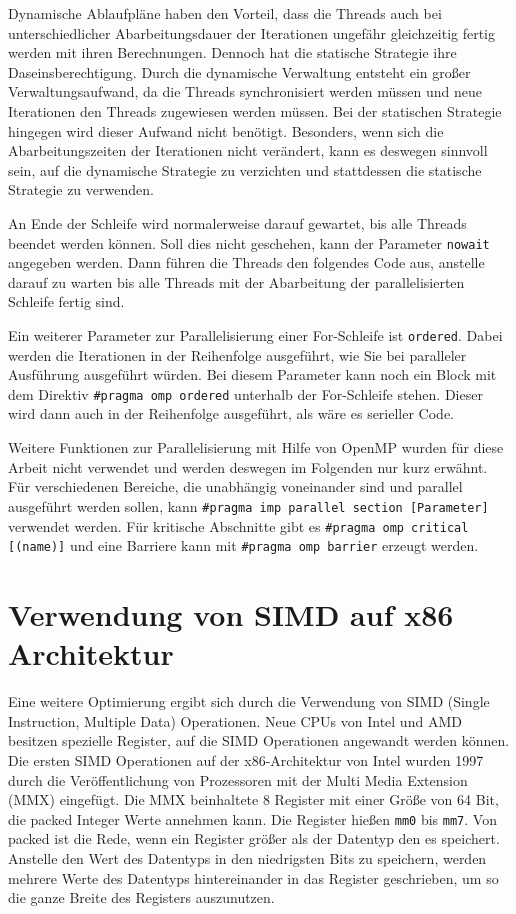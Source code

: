 \documentclass[../main.tex]{subfiles}
\begin{document}
Dynamische Ablaufpläne haben den Vorteil, dass die Threads auch bei unterschiedlicher Abarbeitungsdauer der Iterationen ungefähr gleichzeitig fertig werden mit ihren Berechnungen. Dennoch hat die statische Strategie ihre Daseinsberechtigung. Durch die dynamische Verwaltung entsteht ein großer Verwaltungsaufwand, da die Threads synchronisiert werden müssen und neue Iterationen den Threads zugewiesen werden müssen. Bei der statischen Strategie hingegen wird dieser Aufwand nicht benötigt. Besonders, wenn sich die Abarbeitungszeiten der Iterationen nicht verändert, kann es deswegen sinnvoll sein, auf die dynamische Strategie zu verzichten und stattdessen die statische Strategie zu verwenden.

An Ende der Schleife wird normalerweise darauf gewartet, bis alle Threads beendet werden können. Soll dies nicht geschehen, kann der Parameter \texttt{nowait} angegeben werden. Dann führen die Threads den folgendes Code aus, anstelle darauf zu warten bis alle Threads mit der Abarbeitung der parallelisierten Schleife fertig sind.

Ein weiterer Parameter zur Parallelisierung einer For-Schleife ist \texttt{ordered}. Dabei werden die Iterationen in der Reihenfolge ausgeführt, wie Sie bei paralleler Ausführung ausgeführt würden. Bei diesem Parameter kann noch ein Block mit dem Direktiv \texttt{\#pragma omp ordered} unterhalb der For-Schleife stehen. Dieser wird dann auch in der Reihenfolge ausgeführt, als wäre es serieller Code.

Weitere Funktionen zur Parallelisierung mit Hilfe von OpenMP wurden für diese Arbeit nicht verwendet und werden deswegen im Folgenden nur kurz erwähnt.
Für verschiedenen Bereiche, die unabhängig voneinander sind und parallel ausgeführt werden sollen, kann \texttt{\#pragma imp parallel section [Parameter]} verwendet werden.
Für kritische Abschnitte gibt es \texttt{\#pragma omp critical [(name)]} und eine Barriere kann mit \texttt{\#pragma omp barrier} erzeugt werden.

\section{Verwendung von SIMD auf x86 Architektur}

Eine weitere Optimierung ergibt sich durch die Verwendung von SIMD (Single Instruction, Multiple Data) Operationen.  Neue CPUs von Intel und AMD besitzen spezielle Register, auf die SIMD Operationen angewandt werden können. 
Die ersten SIMD Operationen auf der x86-Architektur von Intel wurden 1997 durch die Veröffentlichung von Prozessoren mit der Multi Media Extension (MMX) eingefügt. Die MMX beinhaltete 8 Register mit einer Größe von 64 Bit, die packed Integer Werte annehmen kann. Die Register hießen \texttt{mm0} bis \texttt{mm7}.
Von packed ist die Rede, wenn ein Register größer als der Datentyp den es speichert. Anstelle den Wert des Datentyps in den niedrigsten Bits zu speichern, werden mehrere Werte des Datentyps hintereinander in das Register geschrieben, um so die ganze Breite des Registers auszunutzen.
\end{document}
